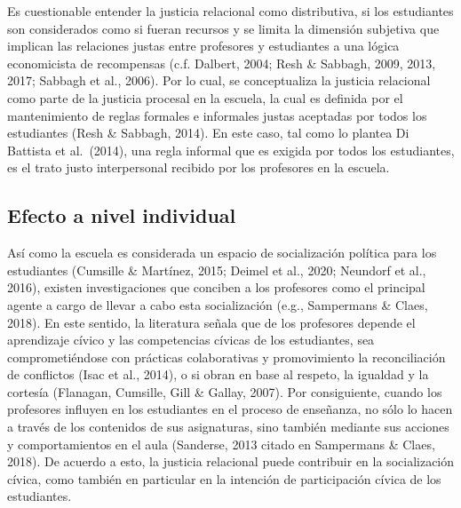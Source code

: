 \documentclass[12pt,twoside]{templates/facsothesis}
\begin{document}
Es cuestionable entender la justicia relacional como distributiva, si los estudiantes son considerados como si fueran recursos y se limita la dimensión subjetiva que implican las relaciones justas entre profesores y estudiantes a una lógica economicista de recompensas (c.f. Dalbert, 2004; Resh \& Sabbagh, 2009, 2013, 2017; Sabbagh et al., 2006). Por lo cual, se conceptualiza la justicia relacional como parte de la justicia procesal en la escuela, la cual es definida por el mantenimiento de reglas formales e informales justas aceptadas por todos los estudiantes (Resh \& Sabbagh, 2014). En este caso, tal como lo plantea Di Battista et al.~(2014), una regla informal que es exigida por todos los estudiantes, es el trato justo interpersonal recibido por los profesores en la escuela.

\hypertarget{efecto-a-nivel-individual-1}{%
\subsection{Efecto a nivel individual}\label{efecto-a-nivel-individual-1}}

Así como la escuela es considerada un espacio de socialización política para los estudiantes (Cumsille \& Martínez, 2015; Deimel et al., 2020; Neundorf et al., 2016), existen investigaciones que conciben a los profesores como el principal agente a cargo de llevar a cabo esta socialización (e.g., Sampermans \& Claes, 2018). En este sentido, la literatura señala que de los profesores depende el aprendizaje cívico y las competencias cívicas de los estudiantes, sea comprometiéndose con prácticas colaborativas y promovimiento la reconciliación de conflictos (Isac et al., 2014), o si obran en base al respeto, la igualdad y la cortesía (Flanagan, Cumsille, Gill \& Gallay, 2007). Por consiguiente, cuando los profesores influyen en los estudiantes en el proceso de enseñanza, no sólo lo hacen a través de los contenidos de sus asignaturas, sino también mediante sus acciones y comportamientos en el aula (Sanderse, 2013 citado en Sampermans \& Claes, 2018). De acuerdo a esto, la justicia relacional puede contribuir en la socialización cívica, como también en particular en la intención de participación cívica de los estudiantes.
\end{document}
